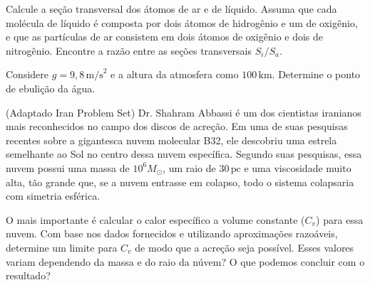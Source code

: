 \documentclass[11pt]{article}
\begin{document}
\begin{pproblem}
\begin{alternativas}
\item Calcule a seção transversal dos átomos de ar e de líquido. Assuma que cada molécula de líquido é composta por dois átomos de hidrogênio e um de oxigênio, e que as partículas de ar consistem em dois átomos de oxigênio e dois de nitrogênio. Encontre a razão entre as seções transversais $S_i/S_a$. 

\item Considere $g = 9,8 \, \text{m/s}^2$ e a altura da atmosfera como $100 \, \text{km}$. Determine o ponto de ebulição da água. 

\end{alternativas}

\end{pproblem}

\begin{pproblem} (Adaptado Iran Problem Set)
    Dr. Shahram Abbassi é um dos cientistas iranianos mais reconhecidos no campo dos discos de acreção. Em uma de suas pesquisas recentes sobre a gigantesca nuvem molecular B32, ele descobriu uma estrela semelhante ao Sol no centro dessa nuvem específica. Segundo suas pesquisas, essa nuvem possui uma massa de $10^6 M_\odot$, um raio de $30 \, \text{pc}$ e uma viscosidade muito alta, tão grande que, se a nuvem entrasse em colapso, todo o sistema colapsaria com simetria esférica.

    O mais importante é calcular o calor específico a volume constante ($C_v$) para essa nuvem. Com base nos dados fornecidos e utilizando aproximações razoáveis, determine um limite para $C_v$ de modo que a acreção seja possível. Esses valores variam dependendo da massa e do raio da núvem? O que podemos concluir com o resultado?

\end{pproblem}
\end{document}
